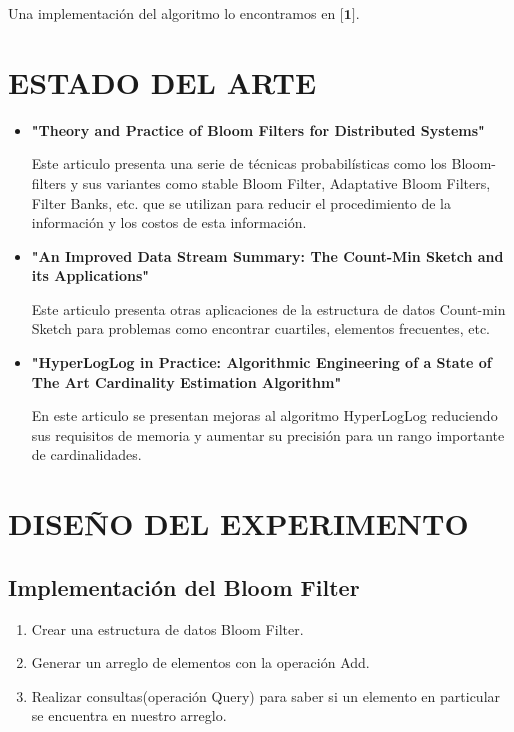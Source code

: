 \documentclass[journal]{IEEEtran}
\begin{document}
Una implementaci\'on del algoritmo lo encontramos en $\textbf{[1]}.$

\section{ESTADO DEL ARTE}

\begin{itemize}

\item \textbf{"Theory and Practice of Bloom Filters for Distributed Systems"}

Este articulo presenta una serie de t\'ecnicas probabil\'isticas como los Bloom-filters y sus variantes como stable Bloom Filter, Adaptative Bloom Filters, Filter Banks, etc. que se utilizan para reducir el procedimiento de la informaci\'on y los costos de esta informaci\'on.\\

\item \textbf{"An Improved Data Stream Summary: The Count-Min Sketch and its Applications"}

Este articulo presenta otras aplicaciones de la estructura de datos Count-min Sketch para problemas como encontrar cuartiles, elementos frecuentes, etc.\\

\item \textbf{"HyperLogLog in Practice: Algorithmic Engineering of a State of The Art Cardinality Estimation Algorithm"}

En este articulo se presentan mejoras al algoritmo HyperLogLog reduciendo sus requisitos de memoria y aumentar su precisi\'on para un rango importante de cardinalidades.\\

\end{itemize}


\section{DISE\~NO DEL EXPERIMENTO}

\subsection{Implementaci\'on del Bloom Filter}

    \begin{enumerate}
	    \item
            Crear una estructura de datos Bloom Filter.
	    \item
	    Generar un arreglo de elementos con la operaci\'on Add.
	    \item
	    Realizar consultas(operaci\'on Query) para saber si un elemento en particular se encuentra en nuestro arreglo.
        \end{enumerate}
\end{document}
